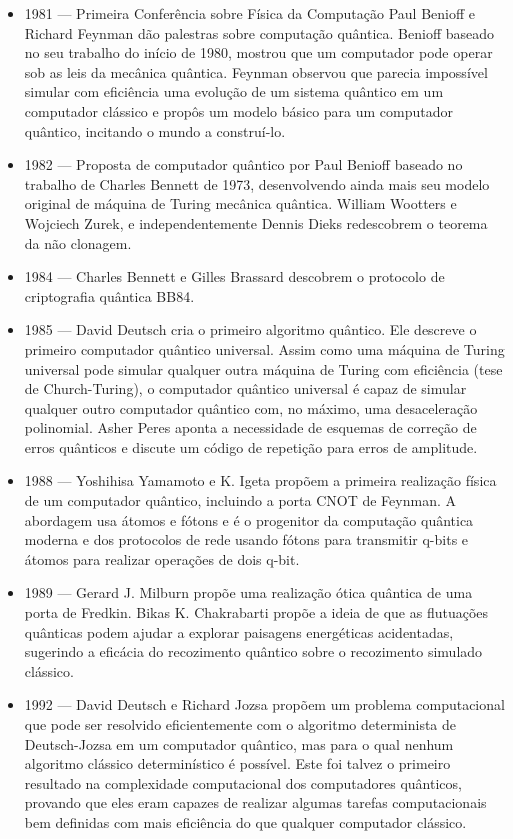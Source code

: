 \documentclass[12pt, a4paper, oneside]{article}
\begin{document}
\begin{itemize}
\item 1981 — Primeira Conferência sobre Física da Computação Paul Benioff e Richard Feynman dão palestras sobre computação quântica. Benioff baseado no seu trabalho do início de 1980, mostrou que um computador pode operar sob as leis da mecânica quântica. Feynman observou que parecia impossível simular com eficiência uma evolução de um sistema quântico em um computador clássico e propôs um modelo básico para um computador quântico, incitando o mundo a construí-lo. 
\item 1982 — Proposta de computador quântico por Paul Benioﬀ baseado no trabalho de Charles Bennett de 1973, desenvolvendo ainda mais seu modelo original de máquina de Turing mecânica quântica. William Wootters e Wojciech Zurek, e independentemente Dennis Dieks redescobrem o teorema da não clonagem.
\item 1984 — Charles Bennett e Gilles Brassard descobrem o protocolo de criptografia quântica BB84.
\item 1985 — David Deutsch cria o primeiro algoritmo quântico. Ele descreve o primeiro computador quântico universal. Assim como uma máquina de Turing universal pode simular qualquer outra máquina de Turing com eficiência (tese de Church-Turing), o computador quântico universal é capaz de simular qualquer outro computador quântico com, no máximo, uma desaceleração polinomial. Asher Peres aponta a necessidade de esquemas de correção de erros quânticos e discute um código de repetição para erros de amplitude.
\item 1988 — Yoshihisa Yamamoto e K. Igeta propõem a primeira realização física de um computador quântico, incluindo a porta CNOT de Feynman. A abordagem usa átomos e fótons e é o progenitor da computação quântica moderna e dos protocolos de rede usando fótons para transmitir q-bits e átomos para realizar operações de dois q-bit.
\item 1989 — Gerard J. Milburn propõe uma realização ótica quântica de uma porta de Fredkin. Bikas K. Chakrabarti propõe a ideia de que as flutuações quânticas podem ajudar a explorar paisagens energéticas acidentadas, sugerindo a eficácia do recozimento quântico sobre o recozimento simulado clássico.
\item 1992 — David Deutsch e Richard Jozsa propõem um problema computacional que pode ser resolvido eficientemente com o algoritmo determinista de Deutsch-Jozsa em um computador quântico, mas para o qual nenhum algoritmo clássico determinístico é possível. Este foi talvez o primeiro resultado na complexidade computacional dos computadores quânticos, provando que eles eram capazes de realizar algumas tarefas computacionais bem definidas com mais eficiência do que qualquer computador clássico.

\end{itemize}
\end{document}
